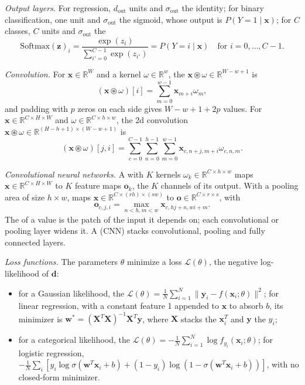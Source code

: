 \documentclass[11pt, a4paper]{exam}
\begin{document}
\begin{recap}
    \emph{Output layers.} For regression, $d_{\text{out}}$ units and $\sigma_\text{out}$ the identity; for binary classification, one unit and $\sigma_\text{out}$ the sigmoid, whose output is $P(Y = 1 \mid \mathbf{x})$; for $C$ classes, $C$ units and $\sigma_\text{out}$ the 
    \[
        \mathrm{Softmax}(\mathbf{z})_i = \frac{\exp(z_i)}{\sum_{i'=0}^{C-1} \exp(z_{i'})} = P(Y = i \mid \mathbf{x}) \quad \text{for } i = 0, \ldots, C-1.
    \]

    \emph{Convolution.} For $\mathbf{x} \in \mathbb{R}^W$ and a kernel $\omega \in \mathbb{R}^w$, the  $\mathbf{x} \circledast \omega \in \mathbb{R}^{W - w + 1}$ is
    \[
        (\mathbf{x} \circledast \omega)[i] = \sum_{m=0}^{w-1} \mathbf{x}_{m+i} \omega_m,
    \]
    and padding with $p$ zeros on each side gives $W - w + 1 + 2p$ values. For $\mathbf{x} \in \mathbb{R}^{C \times H \times W}$ and $\omega \in \mathbb{R}^{C \times h \times w}$, the 2d convolution $\mathbf{x} \circledast \omega \in \mathbb{R}^{(H - h + 1) \times (W - w + 1)}$ is
    \[
        (\mathbf{x} \circledast \omega)[j, i] = \sum_{c=0}^{C-1} \sum_{n=0}^{h-1} \sum_{m=0}^{w-1} \mathbf{x}_{c, n+j, m+i} \omega_{c, n, m}.
    \]

    \emph{Convolutional neural networks.} A  with $K$ kernels $\omega_k \in \mathbb{R}^{C \times h \times w}$ maps $\mathbf{x} \in \mathbb{R}^{C \times H \times W}$ to $K$ feature maps $\mathbf{o}_k$, the $K$ channels of its output. With a pooling area of size $h \times w$,  maps $\mathbf{x} \in \mathbb{R}^{C \times (rh) \times (sw)}$ to $\mathbf{o} \in \mathbb{R}^{C \times r \times s}$, with
    \[
        \mathbf{o}_{c,j,i} = \max_{n < h, m < w} \mathbf{x}_{c,hj+n,wi+m}.
    \]
    The  of a value is the patch of the input it depends on; each convolutional or pooling layer widens it. A  (CNN) stacks convolutional, pooling and fully connected layers.

    \emph{Loss functions.} The parameters $\theta$ minimize a loss $\mathcal{L}(\theta)$, the negative log-likelihood of $\mathbf{d}$:
    \begin{itemize}
        \item for a Gaussian likelihood, the  $\mathcal{L}(\theta) = \frac{1}{N} \sum_{i=1}^N \lVert \mathbf{y}_i - f(\mathbf{x}_i; \theta) \rVert^2$; for linear regression, with a constant feature 1 appended to $\mathbf{x}$ to absorb $b$, its minimizer is $\mathbf{w}^* = (\mathbf{X}^T \mathbf{X})^{-1} \mathbf{X}^T \mathbf{y}$, where $\mathbf{X}$ stacks the $\mathbf{x}_i^T$ and $\mathbf{y}$ the $y_i$;
        \item for a categorical likelihood, the  $\mathcal{L}(\theta) = -\frac{1}{N} \sum_{i=1}^N \log f_{y_i}(\mathbf{x}_i; \theta)$; for logistic regression, $-\frac{1}{N} \sum_{i} \left[ y_i \log \sigma(\mathbf{w}^T \mathbf{x}_i + b) + (1 - y_i) \log(1 - \sigma(\mathbf{w}^T \mathbf{x}_i + b)) \right]$, with no closed-form minimizer.
    \end{itemize}


\end{recap}
\end{document}
